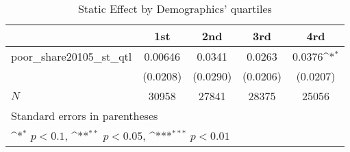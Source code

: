 \begin{table}[htbp]\centering
\def\sym#1{\ifmmode^{#1}\else\(^{#1}\)\fi}
\caption{Static Effect by Demographics' quartiles}
\begin{tabular}{l*{4}{c}}
\hline\hline
            &\multicolumn{1}{c}{1st}&\multicolumn{1}{c}{2nd}&\multicolumn{1}{c}{3rd}&\multicolumn{1}{c}{4rd}\\
\hline
poor\_share20105\_st\_qtl&     0.00646         &      0.0341         &      0.0263         &      0.0376\sym{*}  \\
            &    (0.0208)         &    (0.0290)         &    (0.0206)         &    (0.0207)         \\
\hline
\(N\)       &       30958         &       27841         &       28375         &       25056         \\
\hline\hline
\multicolumn{5}{l}{\footnotesize Standard errors in parentheses}\\
\multicolumn{5}{l}{\footnotesize \sym{*} \(p<0.1\), \sym{**} \(p<0.05\), \sym{***} \(p<0.01\)}\\
\end{tabular}
\end{table}
